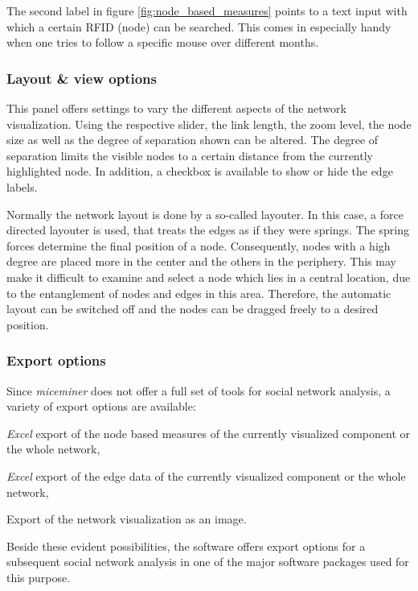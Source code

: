 The second label in figure \ref{fig:node_based_measures} points to a text input with which a certain RFID (node) can be searched. This comes in especially handy when one tries to follow a specific mouse over different months.     

\subsubsection*{Layout \& view options}

This panel offers settings to vary the different aspects of the network visualization. Using the respective slider, the link length, the zoom level, the node size as well as the degree of separation shown can be altered. The degree of separation limits the visible nodes to a certain distance from the currently highlighted node. In addition, a checkbox is available to show or hide the edge labels.

Normally the network layout is done by a so-called layouter. In this case, a force directed layouter is used, that treats the edges as if they were springs. The spring forces determine the final position of a node. Consequently, nodes with a high degree are placed more in the center and the others in the periphery. This may make it difficult to examine and select a node which lies in a central location, due to the entanglement of nodes and edges in this area. Therefore, the automatic layout can be switched off and the nodes can be dragged freely to a desired position.

\subsubsection*{Export options} 
\label{subsubsec:export_options}

Since \textit{miceminer} does not offer a full set of tools for social network analysis, a variety of export options are available:

\begin{mylist}
\item \textit{Excel} export of the node based measures of the currently visualized component or the whole network,
\item \textit{Excel} export of the edge data of the currently visualized component or the whole network,
\item Export of the network visualization as an image.
\end{mylist}

Beside these evident possibilities, the software offers export options for a subsequent social network analysis in one of the major software packages used for this purpose.

